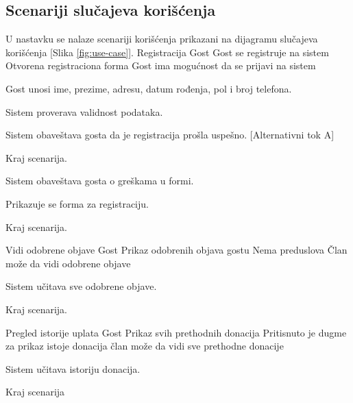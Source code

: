 \subsection{Scenariji slučajeva korišćenja}
\par U nastavku se nalaze scenariji korišćenja prikazani na dijagramu slučajeva korišćenja [Slika \ref{fig:use-case}].
        {Registracija}
        {Gost}
        {Gost se registruje na sistem}
        {Otvorena registraciona forma}
        {Gost ima mogućnost da se prijavi na sistem}
        {
            \item Gost unosi ime, prezime, adresu, datum rođenja, pol i broj telefona.
            \item Sistem proverava validnost podataka.
            \item Sistem obaveštava gosta da je registracija prošla uspešno. [Alternativni tok A]
            \item Kraj scenarija.
        }
        {
            {
                \item Sistem obaveštava gosta o greškama u formi.
                \item Prikazuje se forma za registraciju.
                \item Kraj scenarija.
            }
        }
          {Vidi odobrene objave}
          {Gost}
          {Prikaz odobrenih objava gostu}
          {Nema preduslova}
          {Član može da vidi odobrene objave}
          {
            \item Sistem učitava sve odobrene objave.
            \item Kraj scenarija.
          }
          {}

         {Pregled istorije uplata}
         {Gost}
         {Prikaz svih prethodnih donacija}
         {Pritisnuto je dugme za prikaz istoje donacija}
         {član može da vidi sve prethodne donacije}
         {
            \item Sistem učitava istoriju donacija.
            \item Kraj scenarija
         }
         {}


